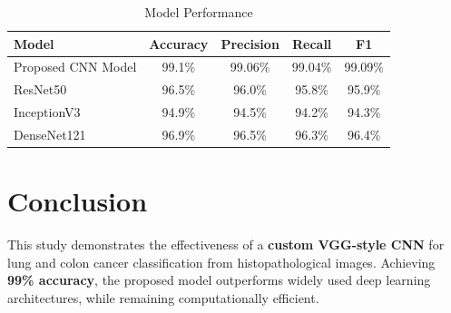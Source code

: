\documentclass{ieeeaccess}
\begin{document}
\begin{table}[t]
\centering
\caption{Model Performance }
\label{tab:performance}
\begin{tabular}{@{}lcccc@{}}
\toprule
\textbf{Model} & \textbf{Accuracy} & \textbf{Precision} & \textbf{Recall} & \textbf{F1} \\ \midrule
Proposed CNN Model & 99.1\% & 99.06\% & 99.04\% & 99.09\% \\
ResNet50           & 96.5\% & 96.0\% & 95.8\% & 95.9\% \\
InceptionV3        & 94.9\% & 94.5\% & 94.2\% & 94.3\% \\
DenseNet121        & 96.9\% & 96.5\% & 96.3\% & 96.4\% \\
\bottomrule
\end{tabular}
\end{table}


\section{Conclusion}
This study demonstrates the effectiveness of a \textbf{custom VGG-style CNN} for lung and colon cancer classification from histopathological images. Achieving \textbf{99\% accuracy}, the proposed model outperforms widely used deep learning architectures, while remaining computationally efficient.
\end{document}
